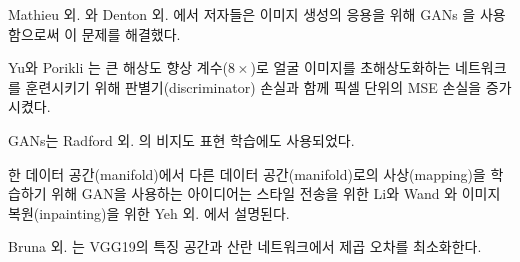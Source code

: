 \documentclass[10pt,twocolumn,letterpaper]{article}
\newcommand{\kor}[1]{#1}
\newcommand{\eng}[1]{}
\newcommand{\summary}[1]{}
\begin{document}
\eng{
In Mathieu et al. \cite{Mathieu2015} and Denton et al. \cite{Denton2015} the authors tackled this problem by employing \acp{GAN} \cite{Goodfellow14GAN} for the application of image generation.
}\kor{
Mathieu 외. \cite{Mathieu2015}와 Denton 외. \cite{Denton2015}에서 저자들은 이미지 생성의 응용을 위해 \acp{GAN} \cite{Goodfellow14GAN}을 사용함으로써 이 문제를 해결했다.
} \eng{
Yu and Porikli \cite{yu2016ultra} augment pixel-wise \ac{MSE} loss with a discriminator loss to train a network that super-resolves face images with large upscaling factors ($8\times$).
}\kor{
Yu와 Porikli \cite{yu2016ultra}는 큰 해상도 향상 계수($8\times$)로 얼굴 이미지를 초해상도화하는 네트워크를 훈련시키기 위해 판별기(discriminator) 손실과 함께 픽셀 단위의 \ac{MSE} 손실을 증가시켰다.
} \eng{
\acp{GAN} were also used for unsupervised representation learning in Radford et al. \cite{Radford2015}.
}\kor{
\acp{GAN}는 Radford 외. \cite{Radford2015}의 비지도 표현 학습에도 사용되었다.
}
\eng{
The idea of using \acp{GAN} to learn a mapping from one manifold to another is described by Li and Wand \cite{Li2016} for style transfer and Yeh et al. \cite{Yeh2016} for inpainting.
}\kor{
한 데이터 공간(manifold)에서 다른 데이터 공간(manifold)로의 사상(mapping)을 학습하기 위해 GAN을 사용하는 아이디어는 스타일 전송을 위한 Li와 Wand \cite{Li2016}와 이미지 복원(inpainting)을 위한 Yeh 외. \cite{Yeh2016}에서 설명된다.
}
\eng{
Bruna et al. \cite{bruna2016super} minimize the squared error in the feature spaces of VGG19 \cite{simonyan2014very} and scattering networks.
}\kor{
Bruna 외. \cite{bruna2016super}는 VGG19의 특징 공간과 산란 네트워크에서 제곱 오차를 최소화한다.
}

\summary{
얼굴 이미지 초해상도화, 스타일 전송, 이미지 복원 등 다양한 분야에서 사용되는 GAN
}
\end{document}

